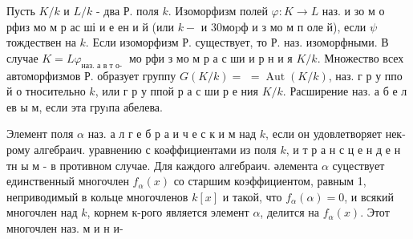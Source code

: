 \documentclass[10pt]{article}
\begin{document}
Пусть $K / k$ и $L / k$ - два Р. поля $k$. Изоморфизм полей $\varphi: K \rightarrow L$ наз. и зо м о рфиз мо м р ас ші и е ен и й (или $k-$ и $30 \mathrm{м} о \mathrm{p} ф$ и з мо м п оле й), если $\psi$ тождествен на $k$. Если изоморфизм Р. существует, то Р. наз. изоморфными. В случае $K=L \varphi_{\text {наз. а в т о- }}$ мо рфи з мо м р а с ши и р н и я $K / k$. Множество всех автоморфизмов Р. образует группу $G(K / k)=$ $=\operatorname{Aut}(K / k)$, наз. г р у ппо й о тносительно $k$, или г р у ппой р а с ши р е ния $K / k$. Расширение наз. а б е л ев ы м, если эта груıпа абелева.



Элемент поля $\alpha$ наз. а л г е б р а и ч е с к и м над $k$, если он удовлетворяет нек-рому алгебраич. уравнению с коәффициентами из поля $k$, и т р а н с ц е н д е н тн ы м - в противном случае. Для каждого алгебраич. әлемента $\alpha$ суцествует единственный многочлен $f_{\alpha}(x)$ со старшим коэффициентом, равным 1, неприводимый в кольце многочленов $k[x]$ и такой, что $f_{\alpha}(\alpha)=0$, и всякий многочлен над $k$, корнем к-рого является элемент $\alpha$, делится на $f_{\alpha}(x)$. Этот многочлен наз. м и н и-
\end{document}

